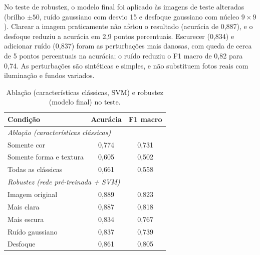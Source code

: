 \documentclass[conference]{IEEEtran}
\begin{document}
No teste de robustez, o modelo final foi aplicado às imagens de teste alteradas (brilho $\pm50$, ruído gaussiano com desvio 15 e desfoque gaussiano com núcleo $9\times9$). Clarear a imagem praticamente não afetou o resultado (acurácia de 0,887), e o desfoque reduziu a acurácia em 2,9 pontos percentuais. Escurecer (0,834) e adicionar ruído (0,837) foram as perturbações mais danosas, com queda de cerca de 5 pontos percentuais na acurácia; o ruído reduziu o F1 macro de 0,82 para 0,74. As perturbações são sintéticas e simples, e não substituem fotos reais com iluminação e fundos variados.

\begin{table}[t]
\caption{Ablação (características clássicas, SVM) e robustez (modelo final) no teste.}\label{tab:abl}\centering
\begin{tabular}{lcc}\toprule
Condição & Acurácia & F1 macro\\\midrule
\multicolumn{3}{l}{\emph{Ablação (características clássicas)}}\\
Somente cor & 0,774 & 0,731\\
Somente forma e textura & 0,605 & 0,502\\
Todas as clássicas & 0,661 & 0,558\\\midrule
\multicolumn{3}{l}{\emph{Robustez (rede pré-treinada + SVM)}}\\
Imagem original & 0,889 & 0,823\\
Mais clara & 0,887 & 0,818\\
Mais escura & 0,834 & 0,767\\
Ruído gaussiano & 0,837 & 0,739\\
Desfoque & 0,861 & 0,805\\\bottomrule
\end{tabular}
\end{table}
\end{document}
